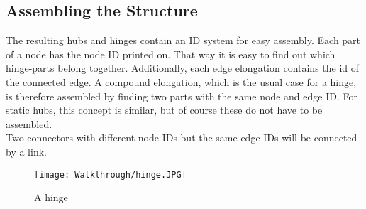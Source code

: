 \subsection{Assembling the Structure}
The resulting hubs and hinges contain an ID system for easy assembly. Each part of a node has the node ID printed on. That way it is easy to find out which hinge-parts belong together. Additionally, each edge elongation  contains the id of the connected edge. A compound elongation, which is the usual case for a hinge, is therefore assembled by finding two parts with the same node and edge ID. For static hubs, this concept is similar, but of course these do not have to be assembled.\\
Two connectors with different node IDs but the same edge IDs will be connected by a link.
\begin{figure}[h!]
    \texttt{[image: Walkthrough/hinge.JPG]}
    \centering
    \caption{A hinge}
    \label{fig:hinge}
\end{figure}
